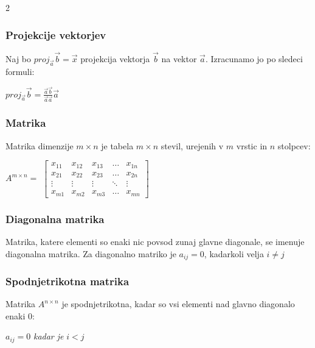 \documentclass{article}
\begin{document}
\begin{multicols}{2}
	\subsubsection{Projekcije vektorjev}

	Naj bo $proj_{\vec{a}}\vec{b} = \vec{x}$ projekcija vektorja $\vec{b}$ na vektor $\vec{a}$.
	Izracunamo jo po sledeci formuli:
	\begin{center}
		\begin{math}
			proj_{\vec{a}}\vec{b} = \frac{\vec{a}\vec{b}}{\vec{a}\vec{a}} \vec{a}
		\end{math}
	\end{center}

	\subsubsection{Matrika}

	Matrika dimenzije $m \times n$ je tabela $m \times n$ stevil, urejenih
	v $m$ vrstic in $n$ stolpcev:
	\begin{center}
		$A^{m \times n} =$
		$\begin{bmatrix}
				x_{11} & x_{12} & x_{13} & \dots  & x_{1n} \\
				x_{21} & x_{22} & x_{23} & \dots  & x_{2n} \\
				\vdots & \vdots & \vdots & \ddots & \vdots \\
				x_{m1} & x_{m2} & x_{m3} & \dots  & x_{mn}
			\end{bmatrix}$
	\end{center}

	\subsubsection{Diagonalna matrika}

	Matrika, katere elementi so enaki nic povsod
	zunaj glavne diagonale, se imenuje diagonalna matrika. Za
	diagonalno matriko je $a_{ij} = 0$, kadarkoli velja $i \neq j$

	\subsubsection{Spodnjetrikotna matrika}

	Matrika $A^{n \times n}$ je spodnjetrikotna, kadar
	so vsi elementi nad glavno diagonalo enaki 0:
	\begin{center}
		$a_{ij} = 0$  \textit{kadar je} $i < j$
	\end{center}


\end{multicols}
\end{document}
